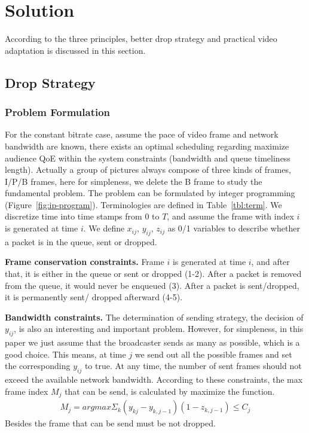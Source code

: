 \newcommand{\Mod}[1]{\text{ (mod } #1\text{)}}
\section{Solution}
According to the three principles, better drop strategy and practical video adaptation is discussed in this section.
\subsection{Drop Strategy}
\subsubsection{Problem Formulation}


For the constant bitrate case, assume the pace of video frame and network bandwidth are known, there exists an optimal scheduling regarding maximize audience QoE within the system constraints (bandwidth and queue timeliness length). Actually a group of pictures always compose of three kinds of frames, I/P/B frames, here for simpleness, we delete the B frame to study the fundamental problem. The problem can be formulated by integer programming (Figure~\ref{fig:ip-program}). Terminologies are defined in Table~\ref{tbl:term}. We discretize time into time stamps from $0$ to $T$, and assume the frame with index $i$ is generated at time $i$. We define $x_{ij}$, $y_{ij}$, $z_{ij}$ as 0/1 variables to describe whether a packet is in the queue, sent or dropped.

\textbf{Frame conservation constraints.}
Frame $i$ is generated at time $i$, and after that, it is either in the queue or sent or dropped (1-2).
After a packet is removed from the queue, it would never be enqueued (3).
After a packet is sent/dropped, it is permanently sent/ dropped afterward (4-5).

\textbf{Bandwidth constraints.}
The determination of sending strategy, the decision of $y_{ij}$, is also an interesting and important problem. However, for simpleness, in this paper we just assume that the broadcaster sends as many as possible, which is a good choice. This means, at time $j$ we send out all the possible frames and set the corresponding $y_{ij}$ to true. At any time, the number of sent frames should not exceed the available network bandwidth. According to these constraints, the max frame index $M_{j}$ that can be send, is calculated by maximize the function.
\begin{align}
M_j = argmax \Sigma_k (y_{kj}-y_{k,j-1})(1-z_{k,j-1}) \leq C_{j}
\end{align}
Besides the frame that can be send must be not dropped.

